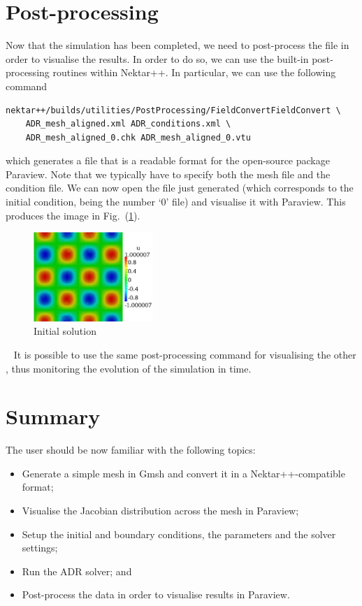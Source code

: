 \section{Post-processing}
\label{adr-post}
Now that the simulation has been completed, we need to post-process the file in order to visualise 
the results. In order to do so, we can use the built-in post-processing routines within Nektar++.
In particular, we can use the following command
%
\begin{lstlisting}[style=BashInputStyle]
nektar++/builds/utilities/PostProcessing/FieldConvertFieldConvert \
    ADR_mesh_aligned.xml ADR_conditions.xml \ 
    ADR_mesh_aligned_0.chk ADR_mesh_aligned_0.vtu
\end{lstlisting}
%
which generates a  file that is a readable format for the open-source package Paraview.
Note that we typically have to specify both the mesh  file and the condition  
file. We can now open the \inlsh{.vtu} file just generated (which corresponds to the initial condition, 
being the number `0' \inlsh{.chk} file) and visualise it with Paraview. This produces the image 
in Fig.~(\ref{f:IC}).
%
\begin{figure}[h!]
\centering
\includegraphics[width=0.4\textwidth]{Figures/ADR_mesh_IC}
\caption{Initial solution}
\label{f:IC}
\end{figure}~
%
It is possible to use the same post-processing command for visualising the other , 
thus monitoring the evolution of the simulation in time.  


\section{Summary}
The user should be now familiar with the following topics:
\vspace{-0.5cm}
\begin{itemize}
\item Generate a simple mesh in Gmsh and convert it in a Nektar++-compatible format;
\item Visualise the Jacobian distribution across the mesh in Paraview;
\item Setup the initial and boundary conditions, the parameters and the solver settings;
\item Run the ADR solver; and
\item Post-process the data in order to visualise results in Paraview.
\end{itemize}


